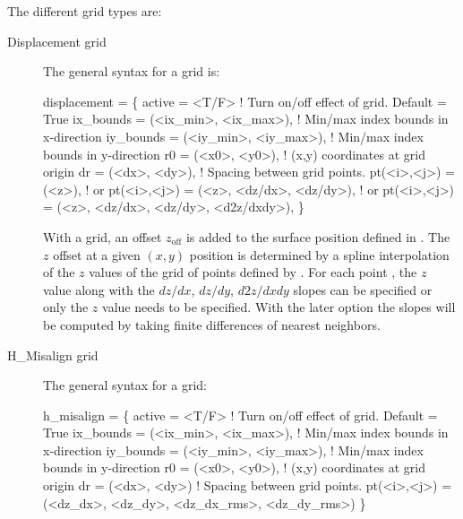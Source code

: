 The different grid types are:
\begin{description}
\item[Displacement grid] \Newline
The general syntax for a  grid is:
\begin{example}
  displacement = \{
      active = <T/F>                     ! Turn on/off effect of grid. Default = True
      ix_bounds = (<ix_min>, <ix_max>),  ! Min/max index bounds in x-direction
      iy_bounds = (<iy_min>, <iy_max>),  ! Min/max index bounds in y-direction
      r0 = (<x0>, <y0>),                 ! (x,y) coordinates at grid origin
      dr = (<dx>, <dy>),                 ! Spacing between grid points.
      pt(<i>,<j>) = (<z>),                                  ! or
      pt(<i>,<j>) = (<z>, <dz/dx>, <dz/dy>),                ! or
      pt(<i>,<j>) = (<z>, <dz/dx>, <dz/dy>, <d2z/dxdy>),
          \}
\end{example}

With a  grid, an offset $z_\text{off}$ is added to the surface
position defined in . The $z$ offset at a given $(x,y)$ position is determined by a
spline interpolation of the $z$ values of the grid of points defined by . For each
point , the $z$ value along with the $dz/dx$, $dz/dy$, $d2z/dxdy$ slopes can be specified or
only the $z$ value needs to be specified. With the later option the slopes will be computed by
taking finite differences of nearest neighbors.
%
\item[H_Misalign grid] \Newline
The general syntax for a  grid:
\begin{example}
  h_misalign = \{
      active = <T/F>                     ! Turn on/off effect of grid. Default = True
      ix_bounds = (<ix_min>, <ix_max>),  ! Min/max index bounds in x-direction
      iy_bounds = (<iy_min>, <iy_max>),  ! Min/max index bounds in y-direction
      r0 = (<x0>, <y0>),                 ! (x,y) coordinates at grid origin
      dr = (<dx>, <dy>)                  ! Spacing between grid points.
      pt(<i>,<j>) = (<dz_dx>, <dz_dy>, <dz_dx_rms>, <dz_dy_rms>)
          \}
\end{example}


\end{description}
